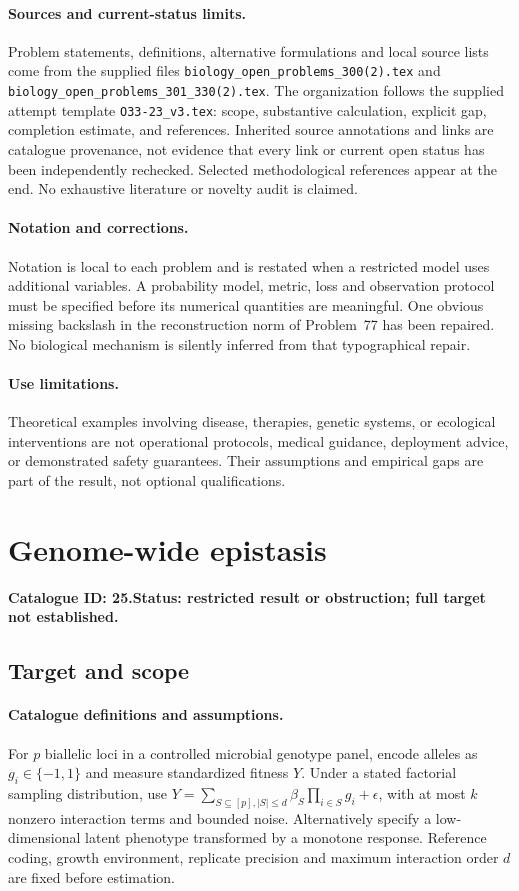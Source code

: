 \documentclass[11pt]{article}
\begin{document}
\paragraph{Sources and current-status limits.}
Problem statements, definitions, alternative formulations and local source lists
come from the supplied files
\texttt{biology\_open\_problems\_300(2).tex} and
\texttt{biology\_open\_problems\_301\_330(2).tex}.
The organization follows the supplied attempt template
\texttt{O33-23\_v3.tex}: scope, substantive calculation, explicit gap,
completion estimate, and references. Inherited source annotations and links are
catalogue provenance, not evidence that every link or current open status has
been independently rechecked. Selected methodological references appear at the
end. No exhaustive literature or novelty audit is claimed.

\paragraph{Notation and corrections.}
Notation is local to each problem and is restated when a restricted model uses
additional variables. A probability model, metric, loss and observation protocol
must be specified before its numerical quantities are meaningful. One obvious
missing backslash in the reconstruction norm of Problem~77 has been repaired.
No biological mechanism is silently inferred from that typographical repair.

\paragraph{Use limitations.}
Theoretical examples involving disease, therapies, genetic systems, or ecological
interventions are not operational protocols, medical guidance, deployment advice,
or demonstrated safety guarantees. Their assumptions and empirical gaps are part
of the result, not optional qualifications.

\setcounter{section}{24}
\section{Genome-wide epistasis}
\label{prob:025}
\noindent\textbf{Catalogue ID: 25.}\quad \textbf{Status: restricted result or obstruction; full target not established.}
\subsection{Target and scope}
\paragraph{Catalogue definitions and assumptions.}
For $p$ biallelic loci in a controlled microbial genotype panel, encode alleles as $g_i\in\{-1,1\}$ and measure standardized fitness $Y$. Under a stated factorial sampling distribution, use $Y=\sum_{S\subseteq[p],|S|\leq d}\beta_S\prod_{i\in S}g_i+\epsilon$, with at most $k$ nonzero interaction terms and bounded noise. Alternatively specify a low-dimensional latent phenotype transformed by a monotone response. Reference coding, growth environment, replicate precision and maximum interaction order $d$ are fixed before estimation.
\end{document}
